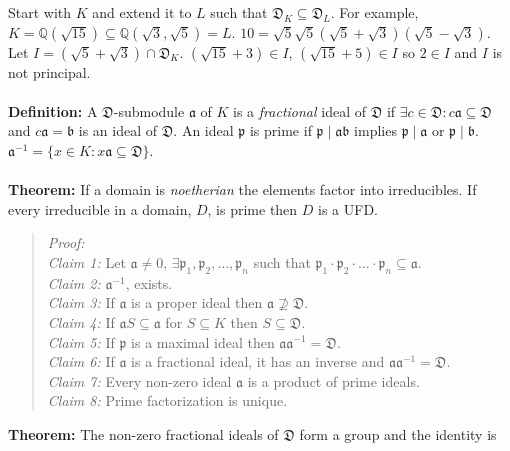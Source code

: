 Start with $K$ and extend it to $L$ such that
${\mathfrak D}_K \subseteq {\mathfrak D}_L$.  For example, 
$K={\mathbb Q}(\sqrt {15}) \subseteq {\mathbb Q}({\sqrt {3}}, {\sqrt {5}})= L$.
$10 = {\sqrt{5}} {\sqrt{5}} ({\sqrt{5}} + {\sqrt{3}}) ({\sqrt{5}} - {\sqrt{3}})$.
Let $I= ({\sqrt{5}} + {\sqrt{3}}) \cap {\mathfrak D}_K$.  
$({\sqrt{15}} + 3) \in I$,
$({\sqrt{15}} + 5) \in I$ so $2 \in I$ and $I$ is not principal.
\\
\\
{\bf Definition:} A ${\mathfrak D}$-submodule ${\mathfrak a}$ of $K$ is a 
\emph{fractional} ideal of ${\mathfrak D}$ if $\exists c \in {\mathfrak D}:
c{\mathfrak a} \subseteq {\mathfrak D}$ and $c {\mathfrak a} = {\mathfrak b}$ is an
ideal of ${\mathfrak D}$.  An ideal ${\mathfrak p}$ is prime if
${\mathfrak p} \mid {\mathfrak a} {\mathfrak b}$ implies
${\mathfrak p} \mid {\mathfrak a}$ or ${\mathfrak p} \mid {\mathfrak b}$.
${\mathfrak a}^{-1}= \{ x \in K: x {\mathfrak a} \subseteq {\mathfrak D} \}$.
\\
\\
{\bf Theorem:}  If a domain is \emph{noetherian} the elements factor into irreducibles.
If every irreducible in a domain, $D$, is prime then $D$ is a UFD.
\begin{quote}
\emph{Proof:}  
\\
\emph{Claim 1:}
Let ${\mathfrak a} \ne 0$, $\exists
{\mathfrak p}_1 , 
{\mathfrak p}_2 , \ldots ,
{\mathfrak p}_n $ 
such that
$ {\mathfrak p}_1 \cdot {\mathfrak p}_2 \cdot \ldots \cdot{\mathfrak p}_n  \subseteq {\mathfrak a}$.
\\
\emph{Claim 2:}
${\mathfrak a}^{-1}$, exists.
\\
\emph{Claim 3:}
If ${\mathfrak a}$ is a proper ideal then
${\mathfrak a} \nsupseteq {\mathfrak D}$.
\\
\emph{Claim 4:}
If 
${\mathfrak a} S \subseteq {\mathfrak a}$ for
$S \subseteq K$ then
$S \subseteq {\mathfrak D}$.
\\
\emph{Claim 5:}
If ${\mathfrak p}$ is a maximal ideal then
${\mathfrak a} {\mathfrak a}^{-1} = {\mathfrak D}$.
\\
\emph{Claim 6:}
If
${\mathfrak a}$ is a fractional ideal, it has an inverse and
${\mathfrak a} {\mathfrak a}^{-1} = {\mathfrak D}$.
\\
\emph{Claim 7:}
Every non-zero ideal ${\mathfrak a}$ is a product of prime ideals.
\\
\emph{Claim 8:}
Prime factorization is unique.
\end{quote}
{\bf Theorem:}
The non-zero fractional ideals of ${\mathfrak D}$ form a group and the identity is
